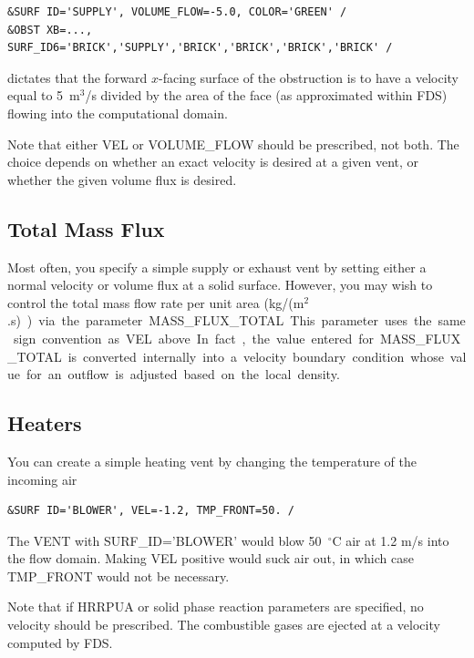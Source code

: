 \documentclass[11pt]{book}
\begin{document}
\begin{lstlisting}
&SURF ID='SUPPLY', VOLUME_FLOW=-5.0, COLOR='GREEN' /
&OBST XB=..., SURF_ID6='BRICK','SUPPLY','BRICK','BRICK','BRICK','BRICK' /
\end{lstlisting}

\noindent
dictates that the forward $x$-facing surface of the obstruction is to have a velocity
equal to 5~m$^3$/s divided by the area of the face (as approximated within FDS) flowing into the
computational domain.


Note that either {\ct VEL} or {\ct VOLUME\_FLOW} should be prescribed,
not both.  The choice depends on whether an exact velocity is desired at a
given vent, or whether the given volume flux is desired.


\subsection{Total Mass Flux}

\label{info:MASS_FLUX_TOTAL}

Most often, you specify a simple supply or exhaust vent by setting either a normal velocity or volume flux at a solid surface. However, you may wish to control the total mass flow rate per unit area (\si{kg/(m$^2$.s)}) via the parameter {\ct MASS\_FLUX\_TOTAL}. This parameter uses the same sign convention as {\ct VEL} above.  In fact, the value entered for {\ct MASS\_FLUX\_TOTAL} is converted internally into a velocity boundary condition whose value for an outflow is adjusted based on the local density.


\subsection{Heaters}

You can create a simple heating vent by changing the temperature of the incoming air

\begin{lstlisting}
&SURF ID='BLOWER', VEL=-1.2, TMP_FRONT=50. /
\end{lstlisting}

\noindent
The {\ct VENT} with {\ct SURF\_ID='BLOWER'} would blow 50~$^\circ$C
air at 1.2 m/s into the flow domain. Making {\ct VEL} positive would
suck air out, in which case {\ct TMP\_FRONT} would not be necessary.

Note that if {\ct HRRPUA} or solid phase reaction parameters are
specified, no velocity should be prescribed. The combustible gases
are ejected at a velocity computed by FDS.
\end{document}
